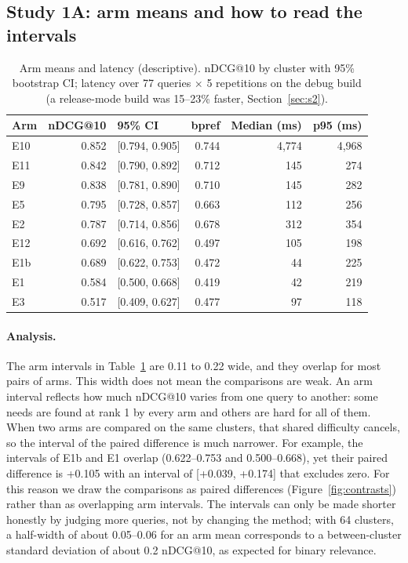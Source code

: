 \documentclass[pdflatex,sn-basic,Numbered]{sn-jnl}
\makeatletter
\newcommand{\ndcg}{nDCG@10}
\makeatother
\begin{document}
\subsection{Study 1A: arm means and how to read the intervals}

\begin{table}[tbp]
\centering\footnotesize\setlength{\tabcolsep}{3pt}
\caption{Arm means and latency (descriptive). \ndcg{} by cluster with 95\% bootstrap CI; latency over 77 queries $\times$ 5 repetitions on the debug build (a release-mode build was 15--23\% faster, Section~\ref{sec:s2}).}
\label{tab:armmeans}
\begin{tabular}{lrlrrr}
\toprule
Arm & \ndcg{} & 95\% CI & bpref & Median (ms) & p95 (ms) \\
\midrule
E10 & 0.852 & [0.794, 0.905] & 0.744 & 4,774 & 4,968 \\
E11 & 0.842 & [0.790, 0.892] & 0.712 & 145 & 274 \\
E9 & 0.838 & [0.781, 0.890] & 0.710 & 145 & 282 \\
E5 & 0.795 & [0.728, 0.857] & 0.663 & 112 & 256 \\
E2 & 0.787 & [0.714, 0.856] & 0.678 & 312 & 354 \\
E12 & 0.692 & [0.616, 0.762] & 0.497 & 105 & 198 \\
E1b & 0.689 & [0.622, 0.753] & 0.472 & 44 & 225 \\
E1 & 0.584 & [0.500, 0.668] & 0.419 & 42 & 219 \\
E3 & 0.517 & [0.409, 0.627] & 0.477 & 97 & 118 \\
\bottomrule
\end{tabular}
\end{table}

\paragraph{Analysis.} The arm intervals in Table~\ref{tab:armmeans} are 0.11 to 0.22 wide, and they overlap for most pairs of arms. This width does not mean the comparisons are weak. An arm interval reflects how much \ndcg{} varies from one query to another: some needs are found at rank 1 by every arm and others are hard for all of them. When two arms are compared on the same clusters, that shared difficulty cancels, so the interval of the paired difference is much narrower. For example, the intervals of E1b and E1 overlap (0.622--0.753 and 0.500--0.668), yet their paired difference is +0.105 with an interval of [+0.039, +0.174] that excludes zero. For this reason we draw the comparisons as paired differences (Figure~\ref{fig:contrasts}) rather than as overlapping arm intervals. The intervals can only be made shorter honestly by judging more queries, not by changing the method; with 64 clusters, a half-width of about 0.05--0.06 for an arm mean corresponds to a between-cluster standard deviation of about 0.2 \ndcg{}, as expected for binary relevance.
\end{document}
